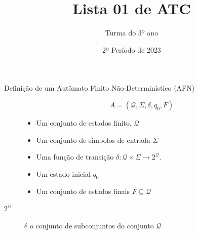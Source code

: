 \documentclass[12pt]{article}
\title{Lista 01 de ATC}
\date{2º Período de 2023}
\author{Turma do 3º ano}
\def\cQ{\mathcal{Q}}
\begin{document}
 


\maketitle

\begin{description}

\item[Definição de um Autômato Finito Não-Determinístico (AFN)]
\[A = (\cQ, \Sigma, \delta, q_0, F)\]
\begin{itemize}
\item Um conjunto de estados finito, $\cQ$
\item Um conjunto de símbolos de entrada $\Sigma$
\item Uma função de transição $\delta: \cQ\times\Sigma\rightarrow 2^\cQ$.
\item Um estado inicial $q_0$
\item Um conjunto de estados finais $F\subseteq \cQ$
\end{itemize}


\item[$2^\cQ$] é o conjunto de subconjuntos do conjunto $\cQ$


\end{description}


\vspace{3em}


\break
\end{document}
